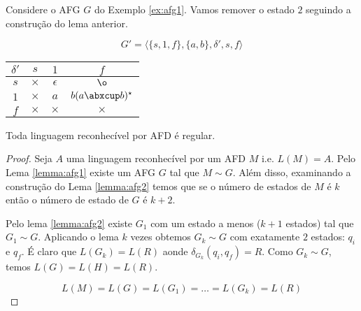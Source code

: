 \begin{example}
\label{ex:afg2}
Considere o AFG $G$ do Exemplo \ref{ex:afg1}.
Vamos remover o estado $2$ seguindo a construção do lema anterior.

\begin{displaymath}
  G' = \langle \{s, 1, f\}, \{a,b\}, \delta', s, f \rangle
\end{displaymath}

  \begin{center}
  \begin{tabular}{c|ccc}
    $\delta'$ & $s$      & $1$           & $f$           \\
    \hline
    $s$       & $\times$ & $\epsilon$    & $\o$   \\
    $1$       & $\times$ & $a$           & $b(a \abxcup b)^\star$  \\
    $f$       & $\times$ & $\times$      & $\times$       \\
  \end{tabular}
  \end{center}

\begin{center}
\end{center}

\end{example}

\begin{theorem}
Toda linguagem reconhecível por AFD é regular.
\end{theorem}
\begin{proof}
  Seja $A$ uma linguagem reconhecível por um AFD $M$ i.e. $L(M) = A$.
  Pelo Lema \ref{lemma:afg1} existe um AFG $G$ tal que $M \sim G$.
  Além disso, examinando a construção do Lema \ref{lemma:afg2} temos que se o número de estados de $M$ é $k$ então o número de estado de $G$ é $k+2$.

  Pelo lema \ref{lemma:afg2} existe $G_1$ com um estado a menos ($k + 1$ estados) tal que $G_1 \sim G$.
  Aplicando o lema $k$ vezes obtemos $G_k \sim G$ com exatamente $2$ estados: $q_i$ e $q_f$.
  É claro que $L(G_k) = L(R)$ aonde $\delta_{G_k}(q_i, q_f) = R$.
  Como $G_k \sim G$, temos $L(G) = L(H) = L(R)$.

  \begin{displaymath}
    L(M) = L(G) = L(G_1) = \dots = L(G_k) = L(R)
  \end{displaymath}
\end{proof}


